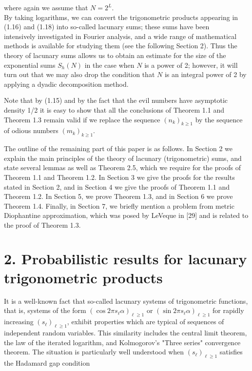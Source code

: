 \documentclass[10pt]{article}
\begin{document}
where again we assume that $N=2^{L}$.\\
By taking logarithms, we can convert the trigonometric products appearing in (1.16) and (1.18) into so-called lacunary sums; these sums have been\\
intensively investigated in Fourier analysis, and a wide range of mathematical methods is available for studying them (see the following Section 2). Thus the theory of lacunary sums allows us to obtain an estimate for the size of the exponential sums $S_{h}(N)$ in the case when $N$ is a power of 2; however, it will turn out that we may also drop the condition that $N$ is an integral power of 2 by applying a dyadic decomposition method.

Note that by (1.15) and by the fact that the evil numbers have asymptotic density 1/2 it is easy to show that all the conclusions of Theorem 1.1 and Theorem 1.3 remain valid if we replace the sequence $\left(n_{k}\right)_{k \geqslant 1}$ by the sequence of odious numbers $\left(m_{k}\right)_{k \geqslant 1}$.

The outline of the remaining part of this paper is as follows. In Section 2 we explain the main principles of the theory of lacunary (trigonometric) sums, and state several lemmas as well as Theorem 2.5, which we require for the proofs of Theorem 1.1 and Theorem 1.2. In Section 3 we give the proofs for the results stated in Section 2, and in Section 4 we give the proofs of Theorem 1.1 and Theorem 1.2. In Section 5, we prove Theorem 1.3, and in Section 6 we prove Theorem 1.4. Finally, in Section 7, we briefly mention a problem from metric Diophantine approximation, which was posed by LeVeque in [29] and is related to the proof of Theorem 1.3.

\section*{2. Probabilistic results for lacunary trigonometric products}
It is a well-known fact that so-called lacunary systems of trigonometric functions, that is, systems of the form $\left(\cos 2 \pi s_{\ell} \alpha\right)_{\ell \geqslant 1}$ or $\left(\sin 2 \pi s_{\ell} \alpha\right)_{\ell \geqslant 1}$ for rapidly increasing $\left(s_{\ell}\right)_{\ell \geqslant 1}$, exhibit properties which are typical of sequences of independent random variables. This similarity includes the central limit theorem, the law of the iterated logarithm, and Kolmogorov's "Three series" convergence theorem. The situation is particularly well understood when $\left(s_{\ell}\right)_{\ell \geqslant 1}$ satisfies the Hadamard gap condition
\end{document}
